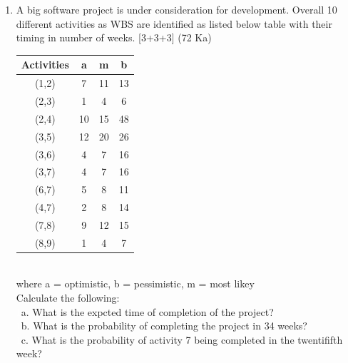 \documentclass[12pt]{article}
\newcommand{\enter}{\\\textcolor{white}{1}}
\begin{document}
\begin{enumerate}
      \item A big software project is under consideration for development. Overall 10 different activities as WBS are identified as listed below table with their timing in number of weeks. \hfill [3+3+3] (72 Ka)\\
        \begin{tabular}{|c|c|c|c|}
          \hline
          Activities & a & m & b \\ \hline
          (1,2) & 7 & 11 & 13 \\ \hline
          (2,3) & 1 & 4 & 6 \\ \hline
          (2,4) & 10 & 15 & 48 \\ \hline
          (3,5) & 12 & 20 & 26 \\ \hline
          (3,6) & 4 & 7 & 16 \\ \hline
          (3,7) & 4 & 7 & 16 \\ \hline
          (6,7) & 5 & 8 & 11 \\ \hline
          (4,7) & 2 & 8 & 14 \\ \hline
          (7,8) & 9 & 12 & 15 \\ \hline
          (8,9) & 1 & 4 & 7 \\ \hline
        \end{tabular}\\
        where a = optimistic, b = pessimistic, m = most likey\\
        Calculate the following:
        \enter a. What is the expcted time of completion of the project?
        \enter b. What is the probability of completing the project in 34 weeks?
        \enter c. What is the probability of activity 7 being completed in the twentififth week?


\end{enumerate}
\end{document}
